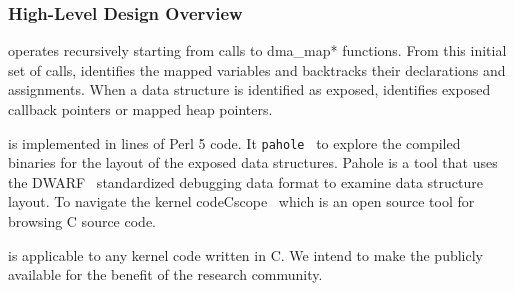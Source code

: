 


\subsubsection{High-Level Design Overview}

\tool operates recursively starting from calls to \DIFaddbegin {}\DIFaddend dma\_map* functions. From this initial set of calls, \tool identifies the mapped variables and backtracks their declarations and assignments\DIFdelbegin {}\DIFdelend . When a data structure is identified as exposed, \tool identifies \DIFaddbegin {}\DIFaddend exposed callback pointers or mapped heap pointers. 



\tool is implemented in \DIFdelbegin \DIFdel{$\approx$}\DIFdelend \DIFaddbegin {} lines of Perl 5 code. It \DIFdelbegin {}\DIFdelend \DIFaddbegin {}\DIFaddend \texttt{pahole}~\cite{dwarves} to explore the compiled binaries for the layout of the exposed data structures. Pahole is a tool that uses the DWARF~\cite{dwarf} standardized debugging data format to examine data structure layout. To navigate the kernel code\DIFaddbegin \DIFadd{, }\DIFaddend \tool \DIFdelbegin {}\DIFdelend \DIFaddbegin {}\DIFaddend Cscope~\cite{cscope,cscope_92} which is an open source tool for browsing C source code.

\tool is applicable to any kernel code written in C. We intend to make the \tool publicly available for the benefit of the research community.


